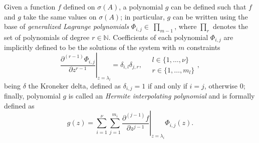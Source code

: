 Given a function $f$ defined on $\sigma(A)$, a polynomial $g$ can be defined
such that $f$ and $g$ take the same values on $\sigma(A)$; in particular, $g$
can be written using the base of \textit{generalized Lagrange polynomials}
$\Phi_{i,j}\in~\prod_{m-1}$, where $\prod_{r}$ denotes the set of polynomials of
degree $r\in\mathbb{N}$. Coefficients of each polynomial $\Phi_{i,j}$ are implicitly
defined to be the solutions of the system with $m$ constraints
\begin{equation}
    \label{eq:Phi-polys-defining-constraints}
    \left. \frac{\partial^{(r-1)}{\Phi_{i,j}}}{\partial{z}^{r-1}} \right|_{z=\lambda_{l}} = \delta_{i,l}\delta_{j,r},
    \quad 
    \begin{array}{l} 
        l\in \lbrace 1, \ldots, \nu \rbrace \\
        r \in \lbrace 1, \ldots, m_{l} \rbrace
    \end{array},
\end{equation}
being $\delta$ the Kroneker delta, defined as $\delta_{i,j}=1$ if and only if
$i=j$, otherwise $0$; finally, polynomial $g$ is called an \emph{Hermite
interpolating polynomial} and is formally defined as
\begin{equation}
\label{eq:Hermite-interpolating-polynomial}
g(z) = \sum_{i=1}^{\nu}{\sum_{j=1}^{m_{i}}{ \left.
\frac{\partial^{(j-1)}{f}}{\partial{z}^{j-1}} \right|_{z=\lambda_{i}}\Phi_{i,j}(z) }}.
\end{equation}

